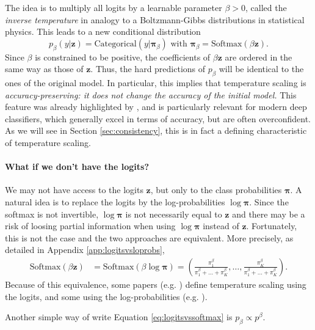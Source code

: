 \documentclass[10pt,dvipsnames]{article}
\newcommand{\bz}{\mathbf{z}}%
\newcommand{\bpi}{\boldsymbol{\pi}}%
\theoremstyle{plain}
\theoremstyle{definition}
\theoremstyle{remark}
\begin{document}
The idea is to multiply all logits by a learnable parameter $\beta > 0$, called the \emph{inverse temperature} in analogy to a Boltzmann-Gibbs distributions in statistical physics. This leads to a new conditional distribution
\begin{equation}
    p_{\beta}(y | \bz) = \text{Categorical}(y |\boldsymbol{\pi}_\beta ) \text{ with } \boldsymbol{\pi}_\beta = \text{Softmax} (\beta \bz ).
\end{equation}
Since $\beta$ is constrained to be positive, the coefficients of $\beta \bz$ are ordered in the same way as those of $\bz$. Thus, the hard predictions of $p_{\beta}$ will be identical to the ones of the original model. In particular, this implies that temperature scaling is \emph{accuracy-preserving: it does not change the accuracy of the initial model.} This feature was already highlighted by \citet{guo2017calibration}, and is particularly relevant for modern deep classifiers, which generally excel in terms of accuracy, but are often overconfident. As we will see in Section \ref{sec:consistency}, this is in fact a defining characteristic of temperature scaling.

\paragraph{What if we don't have the logits?} We may not have access to the logits $\bz$, but only to the class probabilities $\boldsymbol{\pi}$. A natural idea is to replace the logits by the log-probabilities $\log \bpi$. Since the softmax is not invertible, $\log \bpi$ is not necessarily equal to $\bz$ and there may be a risk of loosing partial information when using $\log \bpi$ instead of $\bz$. Fortunately, this is not the case and the two approaches are equivalent. More precisely, as detailed in Appendix  \ref{app:logitsvsloprobs},
\begin{align}
    \text{Softmax} (\beta \bz ) &= \text{Softmax} (\beta \log \bpi ) = \left( \frac{\pi_1^{\beta}}{\pi_1^{\beta}+ \ldots + \pi_K^{\beta}}, \ldots, \frac{\pi_K^{\beta}}{\pi_1^{\beta}+ \ldots + \pi_K^{\beta}} \right).
    \label{eq:logitsvssoftmax}
\end{align}
Because of this equivalence, some papers (e.g. \citealp{guo2017calibration}) define temperature scaling using the logits, and some using the log-probabilities (e.g. \citealp{berta2025structured}).

Another simple way of write Equation \eqref{eq:logitsvssoftmax} is $p_\beta \propto p^\beta$.
\end{document}
